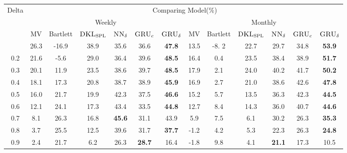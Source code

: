 \documentclass[letterpaper,12pt,titlepage,oneside,final]{book}
\numberwithin{equation}{section}
\theoremstyle{definition}
\newcommand{\model}{\textsc{GRU}_\delta}
\newcommand{\modelN}{\textsc{NN}_\delta}
\newcommand{\DKLs}{\bf\textsc{DKL}_{\text{SPL}}}
\begin{document}
\begin{table}[htp!]
	\centering
	\small
	\begin{threeparttable}
		\begin{tabular}{|c|cccccc| cccccc|}
			\hline
			\multirow{4}{*}{Delta}&\multicolumn{12}{c|}{Comparing Model(\%)}\\
			&\multicolumn{6}{c}{Weekly }&\multicolumn{6}{c|}{Monthly}\\ %
			&{\tiny MV}& {\tiny Bartlett}&\multicolumn{1}{c}{\tiny $\DKLs$}
			&\multicolumn{1}{c}{\tiny $\modelN$ } &\multicolumn{1}{c}{\tiny $\textsc{GRU}_{c}$} &\multicolumn{1}{c}{\tiny $\model$}
            &{\tiny MV}& {\tiny Bartlett} &\multicolumn{1}{c}{\tiny $\DKLs$}
            &\multicolumn{1}{c}{\tiny $\modelN$} &\multicolumn{1}{c}{\tiny $\textsc{GRU}_{c}$} & \multicolumn{1}{c|}{\tiny $\model$ } \\ \hline
			0.1 &26.3 &-16.9   &38.9    &35.6  & 36.6 &\textbf{47.8}   &13.5  & -8. 2   &22.7 &29.7         &34.8     & \textbf{53.9}  \\
			
			0.2 &21.6 &-5.6   &29.0     &36.4    &39.6  &\textbf{48.5}    &16.4  & 0.4   &23.5 &38.4      &38.9   & \textbf{51.7}  \\
			
			0.3 &20.1 &11.9   &23.5     &38.6   &39.7  &\textbf{48.5}    &17.9  & 2.1   &24.0 &40.2         &41.7 & \textbf{50.2}  \\
			
			0.4 &18.1 &17.3   &20.8     &38.7 &38.9  &\textbf{45.9}    &16.9  & 2.7   &21.0 &38.6           & 42.6& \textbf{47.8}  \\
			
			0.5 &16.0 &21.7   &19.9     &42.3   &37.5   &\textbf{46.6}    &15.2  & 5.7   &13.5 &36.3    &42.3       & \textbf{44.5}  \\
			
			0.6 &12.1 &24.1   &17.3     &43.4  &33.5 &\textbf{44.8}    &12.7  & 8.4  &14.3 &36.0       &40.7  & \textbf{44.6}  \\
			
			0.7 &8.1  &26.3   &16.8         &\textbf{45.6}  & 31.1 &43.9    &5.9   & 7.5   &6.1  &30.2        &26.3 & \textbf{35.3}  \\
			
			0.8 &3.7  &25.5   &12.5     &39.6  &31.7 &\textbf{37.7}   &-1.2  & 4.2   &5.3      &22.3         &26.3 & \textbf{24.8}  \\
			
			0.9 &2.4  &21.7   &6.2      &26.3 &\textbf{28.7}&16.4     &-1.8  &9.8    &4.1  &\textbf{21.1}       & 17.3& 10.5  \\
			

\end{tabular}
\end{threeparttable}
\end{table}
\end{document}
